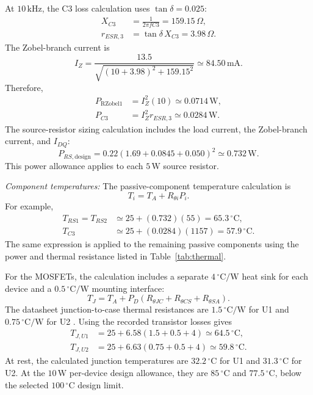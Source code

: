 \documentclass[conference,letterpaper]{IEEEtran}
\newcommand{\Ohm}{\Omega}
\newcommand{\W}{\mathrm{W}}
\newcommand{\kHz}{\mathrm{kHz}}
\begin{document}
At $10\,\kHz$, the C3 loss calculation uses
$\tan\delta=0.025$:
\begin{align}
X_{C3}&=\frac{1}{2\pi fC3}=159.15\,\Ohm,\\
r_{ESR,3}&=\tan\delta\,X_{C3}=3.98\,\Ohm.
\end{align}
The Zobel-branch current is
\begin{equation}
I_Z=\frac{13.5}{\sqrt{(10+3.98)^2+159.15^2}}
\simeq84.50\,\mathrm{mA}.
\end{equation}
Therefore,
\begin{align}
P_{\mathrm{RZobel1}}&=I_Z^2(10)\simeq0.0714\,\W,\\
P_{C3}&=I_Z^2r_{ESR,3}\simeq0.0284\,\W.
\end{align}
The source-resistor sizing calculation includes the load current,
the Zobel-branch current, and $I_{DQ}$:
\begin{equation}
P_{RS,\mathrm{design}}=
0.22(1.69+0.0845+0.050)^2\simeq0.732\,\W.
\end{equation}
This power allowance applies to each $5\,\W$ source resistor.

\emph{Component temperatures:}
The passive-component temperature calculation is
\begin{equation}
T_i=T_A+R_{\theta i}P_i.
\label{eq:thermalpassive}
\end{equation}
For example,
\begin{align}
T_{RS1}=T_{RS2}&\simeq25+(0.732)(55)
=65.3\,{}^\circ\mathrm{C},\\
T_{C3}&\simeq25+(0.0284)(1157)
=57.9\,{}^\circ\mathrm{C}.
\end{align}
The same expression is applied to the remaining passive components
using the power and thermal resistance listed in Table~\ref{tab:thermal}.

For the MOSFETs, the calculation includes a separate
$4\,{}^\circ\mathrm{C/W}$ heat sink for each device and a
$0.5\,{}^\circ\mathrm{C/W}$ mounting interface:
\begin{equation}
T_J=T_A+P_D(R_{\theta JC}+R_{\theta CS}+R_{\theta SA}).
\label{eq:thermalmos}
\end{equation}
The datasheet junction-to-case thermal resistances are
$1.5\,{}^\circ\mathrm{C/W}$ for U1 and
$0.75\,{}^\circ\mathrm{C/W}$ for U2 \cite{irfz44n,irf4905}.
Using the recorded transistor losses gives
\begin{align}
T_{J,U1}&=25+6.58(1.5+0.5+4)
\simeq64.5\,{}^\circ\mathrm{C},\\
T_{J,U2}&=25+6.63(0.75+0.5+4)
\simeq59.8\,{}^\circ\mathrm{C}.
\end{align}
At rest, the calculated junction temperatures are
$32.2\,{}^\circ\mathrm{C}$ for U1 and
$31.3\,{}^\circ\mathrm{C}$ for U2. At the
$10\,\W$ per-device design allowance, they are
$85\,{}^\circ\mathrm{C}$ and $77.5\,{}^\circ\mathrm{C}$,
below the selected $100\,{}^\circ\mathrm{C}$ design limit.
\end{document}
